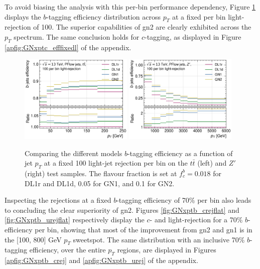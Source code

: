 To avoid biasing the analysis with this per-bin performance dependency, Figure \ref{fig:GNxptb_efffixedl} displays the $b$-tagging efficiency distribution across $p_T$ at a fixed per bin light-rejection of 100. The superior capabilities of \gls{gn2} are clearly exhibited across the $p_T$ spectrum. The same conclusion holds for $c$-tagging, as displayed in Figure \ref{apfig:GNxptc_efffixedl} of the appendix. 
\begin{figure}[h!]
  \centering
  \includegraphics[width=0.48\textwidth]{Images/FTAG/GN/GN2/pt_plots/pt_ttbar_b_eff_fixedlight.png}
  \includegraphics[width=0.48\textwidth]{Images/FTAG/GN/GN2/pt_plots/pt_zp_b_eff_fixedlight.png}
  \caption{Comparing the different models $b$-tagging efficiency as a function of jet $p_T$ at a fixed 100 light-jet rejection per bin on the $t\bar{t}$ (left) and $Z'$ (right) test samples. The flavour fraction is set at $f^b_c = 0.018$ for DL1r and DL1d, 0.05 for GN1, and 0.1 for GN2.}
  \label{fig:GNxptb_efffixedl}
\end{figure} 

Inspecting the rejections at a fixed $b$-tagging efficiency of 70\% per bin also leads to concluding the clear superiority of \gls{gn2}. Figures \ref{fig:GNxptb_crejflat} and \ref{fig:GNxptb_urejflat} respectively display the $c$- and light-rejection for a 70\% $b$-efficiency per bin, showing that most of the improvement from \gls{gn2} and \gls{gn1} is in the [100, 800] GeV $p_T$ sweetspot. The same distribution with an inclusive 70\% $b$-tagging efficiency, over the entire $p_T$ regions, are displayed in Figures \ref{apfig:GNxptb_crej} and \ref{apfig:GNxptb_urej} of the appendix. 

